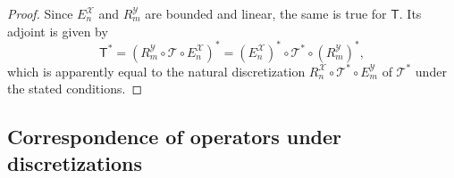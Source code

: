 \documentclass[a4paper]{paper}
\newcommand{\VecSpace}[1]{\mathscr{#1}}
\newcommand{\Op}[1]{\mathcal{#1}}
\newcommand{\DiscOp}[1]{\mathsf{#1}}
\newcommand*{\EXT}[2]{\ensuremath{E_{#1}^{#2}}}
\newcommand*{\REST}[2]{\ensuremath{R_{#1}^{#2}}}
\newcommand*{\RnX}{\ensuremath{\REST{n}{\VecSpace{X}}}}
\newcommand*{\RmY}{\ensuremath{\REST{m}{\VecSpace{Y}}}}
\newcommand*{\EnX}{\ensuremath{\EXT{n}{\VecSpace{X}}}}
\newcommand*{\EmY}{\ensuremath{\EXT{m}{\VecSpace{Y}}}}
\begin{document}
\begin{proof}
 Since $\EnX$ and $\RmY$ are bounded and linear, the same is true for $\DiscOp{T}$. Its adjoint is given by
 \begin{equation*}
  \DiscOp{T}^* = (\RmY \circ \Op{T} \circ \EnX)^* = (\EnX)^* \circ \Op{T}^* \circ (\RmY)^*,
 \end{equation*}
 which is apparently equal to the natural discretization $\RnX \circ \Op{T}^* \circ \EmY$ of $\Op{T}^*$ under the stated conditions.
\end{proof}


\subsection{Correspondence of operators under discretizations}
\end{document}
